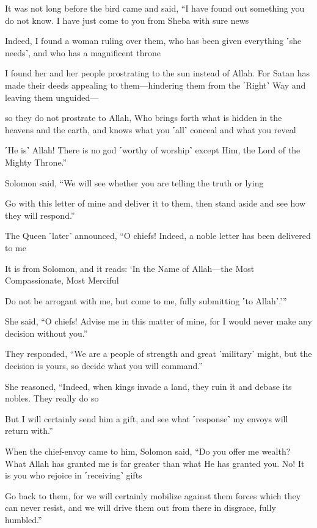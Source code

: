 It was not long before the bird came and said, “I have found out something you do not know. I have just come to you from Sheba with sure news

Indeed, I found a woman ruling over them, who has been given everything ˹she needs˺, and who has a magnificent throne

I found her and her people prostrating to the sun instead of Allah. For Satan has made their deeds appealing to them—hindering them from the ˹Right˺ Way and leaving them unguided—

so they do not prostrate to Allah, Who brings forth what is hidden in the heavens and the earth, and knows what you ˹all˺ conceal and what you reveal

˹He is˺ Allah! There is no god ˹worthy of worship˺ except Him, the Lord of the Mighty Throne.”

Solomon said, “We will see whether you are telling the truth or lying

Go with this letter of mine and deliver it to them, then stand aside and see how they will respond.”

The Queen ˹later˺ announced, “O chiefs! Indeed, a noble letter has been delivered to me

It is from Solomon, and it reads: ‘In the Name of Allah—the Most Compassionate, Most Merciful

Do not be arrogant with me, but come to me, fully submitting ˹to Allah˺.’”

She said, “O chiefs! Advise me in this matter of mine, for I would never make any decision without you.”

They responded, “We are a people of strength and great ˹military˺ might, but the decision is yours, so decide what you will command.”

She reasoned, “Indeed, when kings invade a land, they ruin it and debase its nobles. They really do so

But I will certainly send him a gift, and see what ˹response˺ my envoys will return with.”

When the chief-envoy came to him, Solomon said, “Do you offer me wealth? What Allah has granted me is far greater than what He has granted you. No! It is you who rejoice in ˹receiving˺ gifts

Go back to them, for we will certainly mobilize against them forces which they can never resist, and we will drive them out from there in disgrace, fully humbled.”

